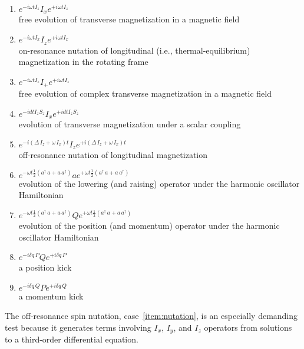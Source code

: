 \documentclass[12pt,letterpaper]{refart}
\begin{document}
\begin{enumerate}
\item $e^{-i\omega t I_z } I_x e^{+i \omega t I_z}$ \\
  free evolution of transverse magnetization in a magnetic field
\item $e^{-i \omega t I_x} I_z e^{+i \omega t I_x}$ \\
  on-resonance nutation of longitudinal (i.e., thermal-equilibrium) magnetization in the rotating frame
\item $e^{-i \omega t I_z} I_{+} e^{+i \omega t I_z}$ \\
  free evolution of complex transverse magnetization in a magnetic field 
\item $e^{-i d t I_z S_z} I_x e^{+i d t I_z S_z}$ \\
  evolution of transverse magnetization under a scalar coupling
\item $e^{-i (\Delta \, I_z + \omega \, I_x) t} I_z e^{+i (\Delta \, I_z + \omega \, I_x) t}$ \\
  \label{item:nutation}
 off-resonance nutation of longitudinal magnetization
\item $e^{- \omega t \frac{1}{2} (a^{\dagger} \, a + a \, a^{\dagger})} a e^{+ \omega t \frac{1}{2} (a^{\dagger} \, a + a \, a^{\dagger})}$  \\
  evolution of the lowering (and raising) operator under the harmonic oscillator Hamiltonian
 \item $e^{- \omega t \frac{1}{2} (a^{\dagger} \, a + a \, a^{\dagger})} Q e^{+ \omega t \frac{1}{2} (a^{\dagger} \, a + a \, a^{\dagger})}$ \\
 evolution of the position (and momentum) operator under the harmonic oscillator Hamiltonian
 \item $e^{-i \delta q \, P }  Q e^{+i \delta q \, P }$ \\
  a position kick
\item $e^{-i \delta q \, Q }  P e^{+i \delta q \, Q }$ \\
  a momentum kick
\end{enumerate}
The off-resonance spin nutation, case~\ref{item:nutation},  is an especially demanding test because it generates terms involving $I_x$, $I_y$, and $I_z$ operators from solutions to a third-order differential equation.




\clearpage
\renewcommand*{\bibfont}{\raggedright\normalfont\small}


\end{document}
